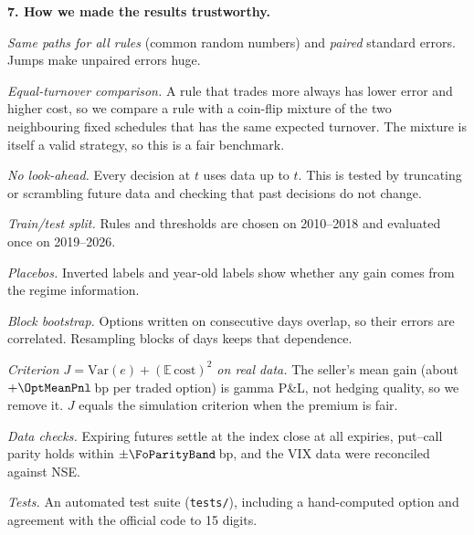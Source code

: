 \documentclass[10pt,leqno]{amsart}
\newcommand{\heading}[1]{\medskip\noindent\textbf{#1}\par}
\begin{document}
\heading{7. How we made the results trustworthy.}
\begin{compactitem}
\item \emph{Same paths for all rules} (common random numbers) and \emph{paired}
standard errors. Jumps make unpaired errors huge.
\item \emph{Equal-turnover comparison.} A rule that trades more always has lower
error and higher cost, so we compare a rule with a coin-flip mixture of the two
neighbouring fixed schedules that has the same expected turnover. The mixture is
itself a valid strategy, so this is a fair benchmark.
\item \emph{No look-ahead.} Every decision at $t$ uses data up to $t$. This is
tested by truncating or scrambling future data and checking that past
decisions do not change.
\item \emph{Train/test split.} Rules and thresholds are chosen on 2010--2018 and
evaluated once on 2019--2026.
\item \emph{Placebos.} Inverted labels and year-old labels show whether any gain
comes from the regime information.
\item \emph{Block bootstrap.} Options written on consecutive days overlap, so
their errors are correlated. Resampling blocks of days keeps that dependence.
\item \emph{Criterion $J=\mathrm{Var}(e)+(\mathbb{E}\,\text{cost})^2$ on real
data.} The seller's mean gain (about $+\OptMeanPnl$\,bp per traded option) is
gamma P\&L, not hedging quality, so we remove it. $J$ equals the simulation
criterion when the premium is fair.
\item \emph{Data checks.} Expiring futures settle at the index close at all
\FoExpiries{} expiries, put--call parity holds within $\pm\FoParityBand$\,bp,
and the VIX data were reconciled against NSE.
\item \emph{Tests.} An automated test suite (\texttt{tests/}), including a
hand-computed option and agreement with the official code to 15 digits.
\end{compactitem}
\end{document}
